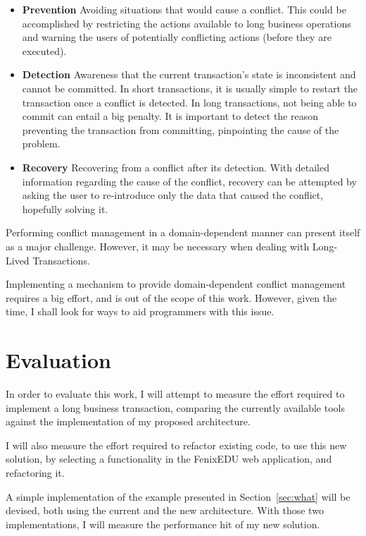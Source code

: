 \documentclass{llncs}
\begin{document}
\begin{itemize}

\item {\bf Prevention} Avoiding situations that would cause a
  conflict. This could be accomplished by restricting the actions
  available to long business operations and warning the users of
  potentially conflicting actions (before they are executed).

\item {\bf Detection} Awareness that the current transaction's state
  is inconsistent and cannot be committed. In short transactions, it
  is usually simple to restart the transaction once a conflict is
  detected. In long transactions, not being able to commit can entail
  a big penalty. It is important to detect the reason preventing the
  transaction from committing, pinpointing the cause of the problem.

\item {\bf Recovery} Recovering from a conflict after its
  detection. With detailed information regarding the cause of the
  conflict, recovery can be attempted by asking the user to
  re-introduce only the data that caused the conflict, hopefully
  solving it.

\end{itemize}

Performing conflict management in a domain-dependent manner can
present itself as a major challenge. However, it may be necessary when
dealing with Long-Lived Transactions.

Implementing a mechanism to provide domain-dependent conflict
management requires a big effort, and is out of the scope of this
work. However, given the time, I shall look for ways to aid
programmers with this issue.

\section{Evaluation}

In order to evaluate this work, I will attempt to measure the effort
required to implement a long business transaction, comparing the
currently available tools against the implementation of my proposed
architecture.

I will also measure the effort required to refactor existing code, to
use this new solution, by selecting a functionality in the FenixEDU
web application, and refactoring it.

A simple implementation of the example presented in
Section~\ref{sec:what} will be devised, both using the current and the
new architecture. With those two implementations, I will measure the
performance hit of my new solution.
\end{document}
